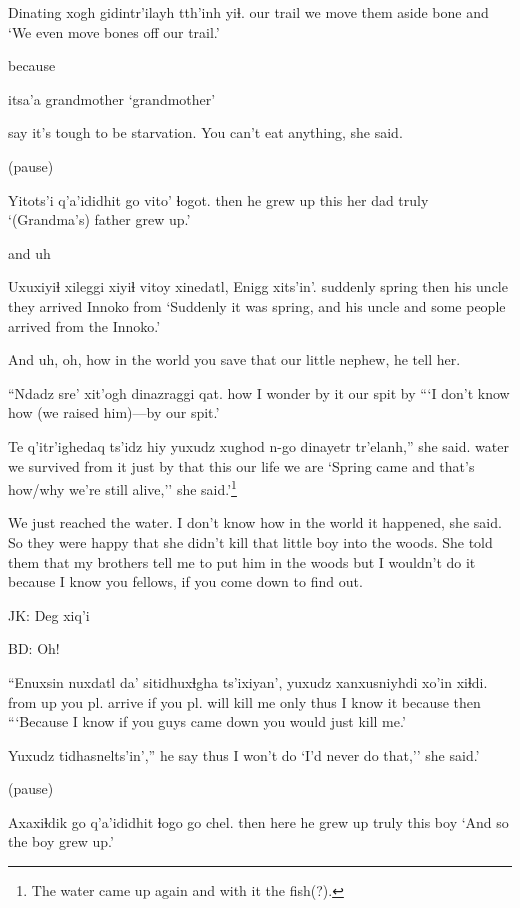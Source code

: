 \documentclass[12pt]{article}
\begin{document}
\gll Dinating  {xogh gidintr'ilayh} tth'inh yiɬ.
{our trail} {we move them aside}   bone   and
\glt `We even move bones off our trail.'
\glend

because 

\gll itsa'a
grandmother
\glt `grandmother'
\glend

say it's tough to be starvation.  You can't eat anything, she said.

(pause)

\gll Yitots'i q'a'ididhit go   vito'   ɬogot. 
then     {he grew up} this {her dad} truly
\glt `(Grandma's) father grew up.'
\glend

and uh

\gll Uxuxiyiɬ   xileggi xiyiɬ vitoy     xinedatl,    Enigg     xits'in'.
suddenly spring  then   {his uncle} {they arrived} Innoko from
\glt `Suddenly it was spring, and his uncle and some people arrived from the Innoko.'
\glend

And uh, oh, how in the world you save that our little nephew, he tell her.

\gll ``Ndadz sre'       xit'ogh dinazraggi qat. 
how {I wonder} {by it}      {our spit}  by
\glt ```I don't know how (we raised him)---by our spit.'
\glend

\gll Te    q'itr'ighedaq ts'idz hiy yuxudz xughod n-go dinayetr tr'elanh,'' she said.
water {we survived}       from   it  just    {by that} this  {our life} {we are}
\glt `Spring came and that's how/why we're still alive,'' she said.'\footnote{The water came up again and with it the fish(?).}
\glend

We just reached the water. I don't know how in the world it happened,
she said.  So they were happy that she didn't kill that little boy
into the woods.  She told them that my brothers tell me to put him in
the woods but I wouldn't do it because I know you fellows, if you come
down to find out.

JK:  Deg xiq'i

BD:  Oh! 

\gll ``Enuxsin nuxdatl        da' sitidhuxɬgha ts'ixiyan', yuxudz xanxusniyhdi xo'in   xiɬdi.
{from up} {you pl. arrive} if  {you pl. will kill me} only     thus   {I know it}  because then
\glt ```Because I know if you guys came down you would just kill me.'
\glend

\gll Yuxudz {tidhasnelts'in',}'' he say
thus   {I won't do}
\glt `I'd never do that,'' she said.' 
\glend

(pause)

\gll Axaxiɬdik go   q'a'ididhit ɬogo     go   chel.
then    here  {he grew up}  truly this boy                          
\glt `And so the boy grew up.'
\glend
\end{document}
